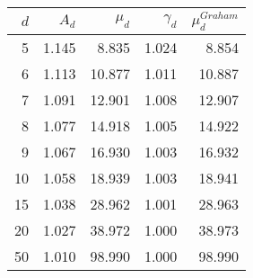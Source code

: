 \begin{tabular}{rrrrr}
\toprule
 $d$ &  $A_d$ &  $\mu_d$ &  $\gamma_d$ &  $\mu_d^{Graham}$ \\
\midrule
   5 &  1.145 &    8.835 &       1.024 &             8.854 \\
   6 &  1.113 &   10.877 &       1.011 &            10.887 \\
   7 &  1.091 &   12.901 &       1.008 &            12.907 \\
   8 &  1.077 &   14.918 &       1.005 &            14.922 \\
   9 &  1.067 &   16.930 &       1.003 &            16.932 \\
  10 &  1.058 &   18.939 &       1.003 &            18.941 \\
  15 &  1.038 &   28.962 &       1.001 &            28.963 \\
  20 &  1.027 &   38.972 &       1.000 &            38.973 \\
  50 &  1.010 &   98.990 &       1.000 &            98.990 \\
\bottomrule
\end{tabular}

